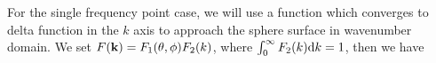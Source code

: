 \documentclass[12pt,draftclsnofoot,journal,onecolumn]{IEEEtran}
\begin{document}
%	
%	
	
	For the single frequency point case, we will use a function which converges to delta function in the $k$ axis to approach the sphere surface in wavenumber domain. We set $F({\bf k}) =F_1(\theta,\phi)F_2(k)$, where $\int_{0}^\infty F_2(k) {\rm d}k = 1$, then we have
	
\end{document}
